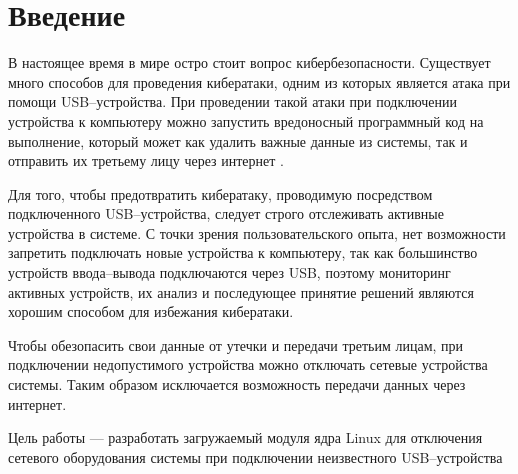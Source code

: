 \chapter*{Введение}

В настоящее время в мире остро стоит вопрос кибербезопасности. Существует много способов для проведения кибератаки, одним из которых является атака при помощи USB--устройства. При проведении такой атаки при подключении устройства к компьютеру можно запустить вредоносный программный код на выполнение, который может как удалить важные данные из системы, так и отправить их третьему лицу через интернет \cite{usbmalware}.

Для того, чтобы предотвратить кибератаку, проводимую посредством подключенного USB--устройства, следует строго отслеживать активные устройства в системе. С точки зрения пользовательского опыта, нет возможности запретить подключать новые устройства к компьютеру, так как большинство устройств ввода--вывода подключаются через USB, поэтому мониторинг активных устройств, их анализ  и последующее принятие решений являются хорошим способом для избежания кибератаки.

Чтобы обезопасить свои данные от утечки и передачи третьим лицам, при подключении недопустимого устройства можно отключать сетевые устройства системы. Таким образом исключается возможность передачи данных через интернет.

Цель работы --- разработать загружаемый модуля ядра Linux для отключения сетевого оборудования системы при подключении неизвестного USB--устройства